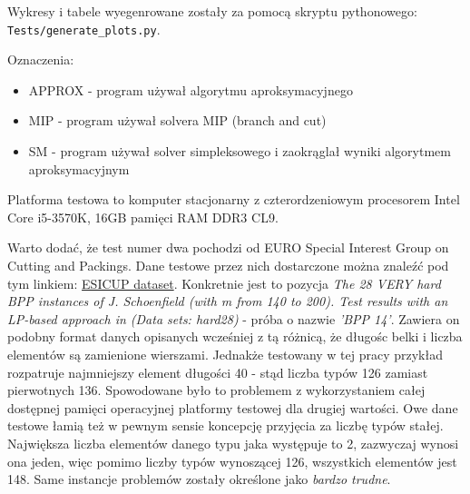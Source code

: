 Wykresy i tabele wyegenrowane zostały za pomocą skryptu pythonowego: \\ \verb|Tests/generate_plots.py|.

Oznaczenia:
\begin{itemize}
	\item APPROX - program używał algorytmu aproksymacyjnego
	\item MIP - program używał solvera MIP (branch and cut)
	\item SM - program używał solver simpleksowego i zaokrąglał wyniki algorytmem aproksymacyjnym
\end{itemize}

Platforma testowa to komputer stacjonarny z czterordzeniowym procesorem Intel Core i5-3570K, 16GB pamięci RAM DDR3 CL9.

Warto dodać, że test numer dwa pochodzi od EURO Special Interest Group on Cutting and Packings. Dane testowe przez nich dostarczone można znaleźć pod tym linkiem:
\href{https://www.euro-online.org/websites/esicup/data-sets/}{ESICUP dataset}.
Konkretnie jest to pozycja \textit{The 28 VERY hard BPP instances of J. Schoenfield (with m from 140 to 200). Test results with an LP-based approach in (Data sets: hard28)} - próba o nazwie \textit{'BPP    14'}. Zawiera on podobny format danych opisanych wcześniej z tą różnicą, że długośc belki i liczba elementów są zamienione wierszami. Jednakże testowany w tej pracy przykład rozpatruje najmniejszy element długości 40 - stąd liczba typów 126 zamiast pierwotnych 136. Spowodowane było to problemem z wykorzystaniem całej dostępnej pamięci operacyjnej platformy testowej dla drugiej wartości. Owe dane testowe łamią też w pewnym sensie koncepcję przyjęcia za liczbę typów stałej. Największa liczba elementów danego typu jaka występuje to 2, zazwyczaj wynosi ona jeden, więc pomimo liczby typów wynoszącej 126, wszystkich elementów jest 148. Same instancje problemów zostały określone jako \textit{bardzo trudne}.



